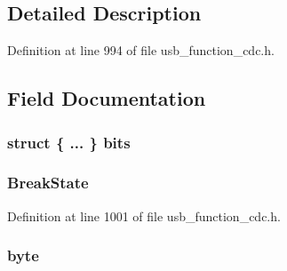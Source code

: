 \subsection{Detailed Description}


Definition at line 994 of file usb\+\_\+function\+\_\+cdc.\+h.



\subsection{Field Documentation}
\hypertarget{union_b_m___s_e_r_i_a_l___s_t_a_t_e_a55739d8ea5df6673892a2bdb5c223006}{}
\subsubsection[{bits}]{\setlength{\rightskip}{0pt plus 5cm}struct \{ ... \}  bits}\label{union_b_m___s_e_r_i_a_l___s_t_a_t_e_a55739d8ea5df6673892a2bdb5c223006}
\hypertarget{union_b_m___s_e_r_i_a_l___s_t_a_t_e_adc18b99a72b94e6de778e6afdab6795a}{}
\subsubsection[{Break\+State}]{ Break\+State}\label{union_b_m___s_e_r_i_a_l___s_t_a_t_e_adc18b99a72b94e6de778e6afdab6795a}


Definition at line 1001 of file usb\+\_\+function\+\_\+cdc.\+h.

\hypertarget{union_b_m___s_e_r_i_a_l___s_t_a_t_e_a4ec262e8432e722273b67cea923f72a6}{}
\subsubsection[{byte}]{ byte}\label{union_b_m___s_e_r_i_a_l___s_t_a_t_e_a4ec262e8432e722273b67cea923f72a6}



